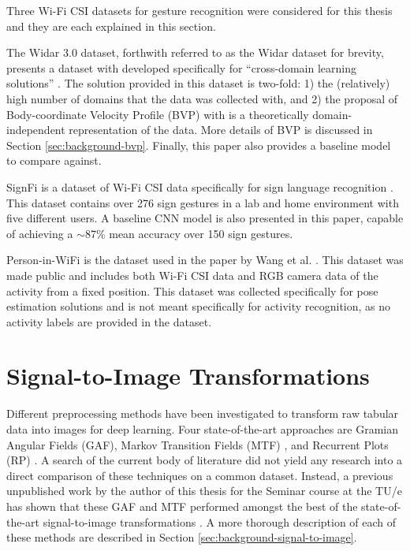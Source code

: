 Three Wi-Fi CSI datasets for gesture recognition were considered for this thesis and they are each explained in this section.

The Widar 3.0 dataset, forthwith referred to as the Widar dataset for brevity, presents a dataset with developed specifically for ``cross-domain learning solutions'' \cite{zheng2019zero}.
The solution provided in this dataset is two-fold: 1) the (relatively) high number of domains that the data was collected with, and 2) the proposal of Body-coordinate Velocity Profile (BVP) with is a theoretically domain-independent representation of the data.
More details of BVP is discussed in Section \ref{sec:background-bvp}.
Finally, this paper also provides a baseline model to compare against.

SignFi is a dataset of Wi-Fi CSI data specifically for sign language recognition \cite{ma2018signfi}.
This dataset contains over 276 sign gestures in a lab and home environment with five different users.
A baseline CNN model is also presented in this paper, capable of achieving a $\sim$87\% mean accuracy over 150 sign gestures.

Person-in-WiFi is the dataset used in the paper by Wang et al. \cite{wang2019person}.
This dataset was made public and includes both Wi-Fi CSI data and RGB camera data of the activity from a fixed position.
This dataset was collected specifically for pose estimation solutions and is not meant specifically for activity recognition, as no activity labels are provided in the dataset.

\section{Signal-to-Image Transformations}

Different preprocessing methods have been investigated to transform raw tabular data into images for deep learning.
Four state-of-the-art approaches are Gramian Angular Fields (GAF), Markov Transition Fields (MTF) \cite{wang2015imaging}, and Recurrent Plots (RP) \cite{eckmann1995recurrence}.
A search of the current body of literature did not yield any research into a direct comparison of these techniques on a common dataset.
Instead, a previous unpublished work by the author of this thesis for the Seminar course at the TU/e has shown that these GAF and MTF performed amongst the best of the state-of-the-art signal-to-image transformations \cite{satyawan2023cnns}.
A more thorough description of each of these methods are described in Section \ref{sec:background-signal-to-image}.

